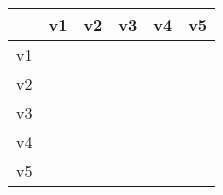 \begin{tabular}{c | c | c | c | c | c}
\rowcolor{gray!30} \cellcolor{gray} & v1 & v2 & v3 & v4 & v5 \\
\hline
\cellcolor{gray!30} v1 & \cellcolor{gray!30} & & & & \\
\hline
\cellcolor{gray!30} v2 & & \cellcolor{gray!30} & & & \\
\hline
\cellcolor{gray!30} v3 & & & \cellcolor{gray!30} & & \\
\hline
\cellcolor{gray!30} v4 & & & & \cellcolor{gray!30} & \\
\hline
\cellcolor{gray!30} v5 & & & & & \cellcolor{gray!30} \\
\end{tabular}

